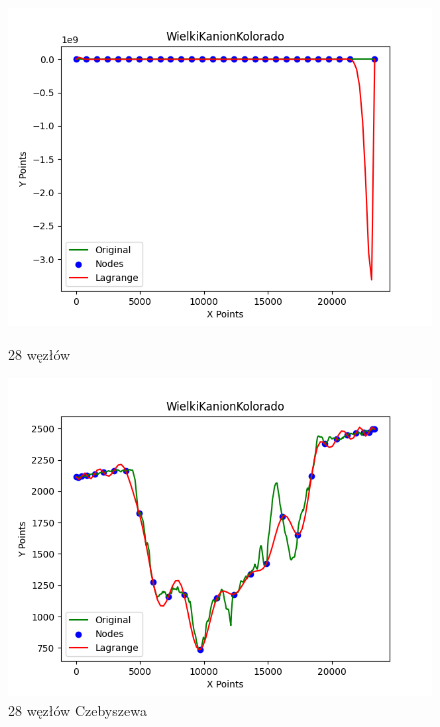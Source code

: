\documentclass{article}
\begin{document}
\begin{figure}[H]
    \centering
    \begin{minipage}[b]{0.49\textwidth}
        \centering
        \includegraphics[width=\textwidth]{plots/WielkiKanionKolorado_lagrange_28.png}
        \caption{28 węzłów}
        \label{fig:7nodes}
    \end{minipage}
    \hfill
    \begin{minipage}[b]{0.49\textwidth}
        \centering
        \includegraphics[width=\textwidth]{plots/WielkiKanionKolorado_lagrange_28_True.png}
        \caption{28 węzłów Czebyszewa}
        \label{fig:7nodes}
    \end{minipage}
\end{figure}
\end{document}
